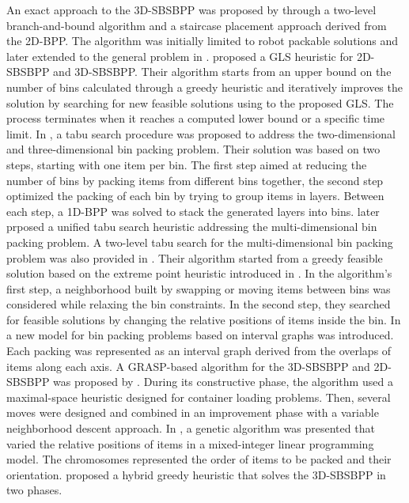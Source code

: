An exact approach to the 3D-SBSBPP was proposed by \cite{martello2000three} through a two-level branch-and-bound algorithm and a staircase placement approach derived from the 2D-BPP.
The algorithm was initially limited to robot packable solutions and later extended to the general problem in \cite{martello2007exact}.
\cite{faroe2003guided} proposed a GLS heuristic for 2D-SBSBPP and 3D-SBSBPP.
Their algorithm starts from an upper bound on the number of bins calculated through a greedy heuristic and iteratively improves the solution by searching for new feasible solutions using to the proposed GLS.
The process terminates when it reaches a computed lower bound or a specific time limit.
In \cite{lodi2002heuristic}, a tabu search procedure was proposed to address the two-dimensional and three-dimensional bin packing problem.
Their solution was based on two steps, starting with one item per bin.
The first step aimed at reducing the number of bins by packing items from different bins together, the second step optimized the packing of each bin by trying to group items in layers.
Between each step, a 1D-BPP was solved to stack the generated layers into bins.
\cite{Lodi2004} later prposed a unified tabu search heuristic addressing the multi-dimensional bin packing problem.
A two-level tabu search for the multi-dimensional bin packing problem was also provided in \cite{crainic2009ts2pack}.
Their algorithm started from a greedy feasible solution based on the extreme point heuristic introduced in \cite{crainic2008extreme}.
In the algorithm's first step, a neighborhood built by swapping or moving items between bins was considered while relaxing the bin constraints.
In the second step, they searched for feasible solutions by changing the relative positions of items inside the bin.
In \cite{fekete2004combinatorial} a new model for bin packing problems based on interval graphs was introduced.
Each packing was represented as an interval graph derived from the overlaps of items along each axis.
A GRASP-based algorithm for the 3D-SBSBPP and 2D-SBSBPP was proposed by \cite{parreno2010hybrid}. During its constructive phase, the algorithm used a maximal-space heuristic designed for container loading problems.
Then, several moves were designed and combined in an improvement phase with a variable neighborhood descent approach.
In \cite{WU2010347}, a genetic algorithm was presented that varied the relative positions of items in a mixed-integer linear programming model. The chromosomes represented the order of items to be packed and their orientation.
\cite{hifi2014hybrid} proposed a hybrid greedy heuristic that solves the 3D-SBSBPP in two phases.

